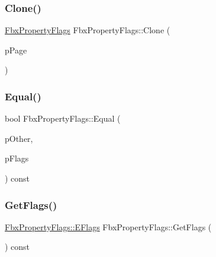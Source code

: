 \subsubsection{\texorpdfstring{Clone()}{Clone()}}
{\footnotesize\ttfamily \hyperlink{class_fbx_property_flags}{Fbx\+Property\+Flags} Fbx\+Property\+Flags\+::\+Clone (\begin{DoxyParamCaption}\item[{\hyperlink{class_fbx_property_page}{Fbx\+Property\+Page} $\ast$}]{p\+Page }\end{DoxyParamCaption})}

\mbox{\label{class_fbx_property_flags_a31bd65991f9d38027df4351e7c668a15}} 
\subsubsection{\texorpdfstring{Equal()}{Equal()}}
{\footnotesize\ttfamily bool Fbx\+Property\+Flags\+::\+Equal (\begin{DoxyParamCaption}\item[{const \hyperlink{class_fbx_property_flags}{Fbx\+Property\+Flags} \&}]{p\+Other,  }\item[{\hyperlink{class_fbx_property_flags_afabfa7e0949aac8a7dcdf8a141867e99}{Fbx\+Property\+Flags\+::\+E\+Flags}}]{p\+Flags }\end{DoxyParamCaption}) const}

\mbox{\label{class_fbx_property_flags_aefc4769c28655bc2217756785bc83918}} 
\subsubsection{\texorpdfstring{Get\+Flags()}{GetFlags()}}
{\footnotesize\ttfamily \hyperlink{class_fbx_property_flags_afabfa7e0949aac8a7dcdf8a141867e99}{Fbx\+Property\+Flags\+::\+E\+Flags} Fbx\+Property\+Flags\+::\+Get\+Flags (\begin{DoxyParamCaption}{ }\end{DoxyParamCaption}) const}

\mbox{\label{class_fbx_property_flags_a8cdb0c6b3dfb7986ce17eed144025e5a}} 

